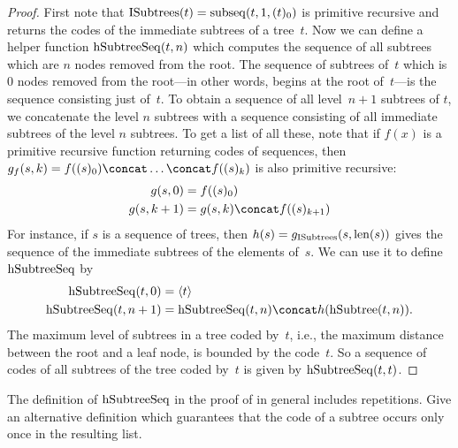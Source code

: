 \documentclass[../../../include/open-logic-section]{subfiles}
\begin{document}
\begin{proof}
  First note that $\mathrm{ISubtrees}(t) = \mathrm{subseq}(t, 1, (t)_0)$ is
  primitive recursive and returns the codes of the immediate subtrees
  of a tree~$t$. Now we can define a helper function
  $\mathrm{hSubtreeSeq}(t,n)$ which computes the sequence of all subtrees
  which are $n$ nodes removed from the root. The sequence of subtrees
  of~$t$ which is $0$ nodes removed from the root---in other words,
  begins at the root of~$t$---is the sequence consisting just
  of~$t$. To obtain a sequence of all level~$n+1$ subtrees of $t$, we
  concatenate the level $n$ subtrees with a sequence consisting of all
  immediate subtrees of the level $n$ subtrees. To get a list of all
  these, note that if $f(x)$ is a primitive recursive function
  returning codes of sequences, then $g_f(s, k) = f((s)_0) \concat
  \dots \concat f((s)_k)$ is also primitive recursive:
    \begin{align*}
      g(s, 0) & = f((s)_0)\\
      g(s, k+1) & = g(s, k) \concat f((s)_{k+1})
    \end{align*}
    For instance, if $s$ is a sequence of trees, then
    $h(s) = g_{\mathrm{ISubtrees}}(s, \mathrm{len}(s))$ gives the sequence of the
    immediate subtrees of the elements of~$s$. We can use it to define
    $\mathrm{hSubtreeSeq}$ by
    \begin{align*}
      \fn{hSubtreeSeq}(t, 0) & = \tuple{t} \\
      \fn{hSubtreeSeq}(t, n+1) & = \fn{hSubtreeSeq}(t, n) \concat
      h(\fn{hSubtree}(t, n)).
    \end{align*}
    The maximum level of subtrees in a tree coded by~$t$, i.e., the
    maximum distance between the root and a leaf node, is bounded by
    the code~$t$. So a sequence of codes of all subtrees of the tree
    coded by~$t$ is given by $\mathrm{hSubtreeSeq}(t, t)$.
\end{proof}

\begin{prob}
  The definition of $\mathrm{hSubtreeSeq}$ in the proof of
   in general includes
  repetitions. Give an alternative definition which guarantees that
  the code of a subtree occurs only once in the resulting list.
\end{prob}
\end{document}
